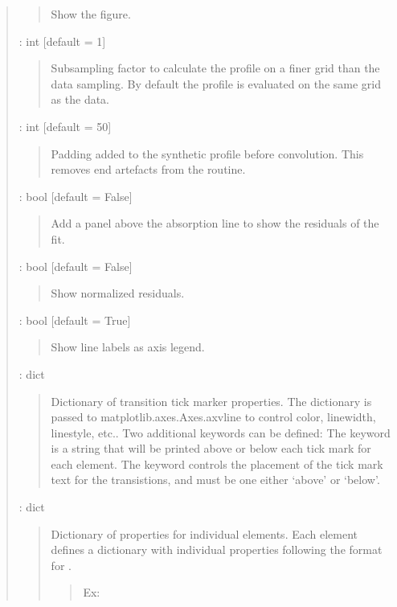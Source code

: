 \documentclass[letterpaper,10pt,english]{sphinxmanual}
\begin{document}
\begin{fulllineitems}
\begin{quote}
\begin{description}
\begin{quote}
Show the figure.
\end{quote}

 : int   {[}default = 1{]}
\begin{quote}

Subsampling factor to calculate the profile on a finer grid than
the data sampling.
By default the profile is evaluated on the same grid as the data.
\end{quote}

 : int   {[}default = 50{]}
\begin{quote}

Padding added to the synthetic profile before convolution.
This removes end artefacts from the  routine.
\end{quote}

 : bool   {[}default = False{]}
\begin{quote}

Add a panel above the absorption line to show the residuals of the fit.
\end{quote}

 : bool   {[}default = False{]}
\begin{quote}

Show normalized residuals.
\end{quote}

 : bool   {[}default = True{]}
\begin{quote}

Show line labels as axis legend.
\end{quote}

 : dict
\begin{quote}

Dictionary of transition tick marker properties. The dictionary is
passed to matplotlib.axes.Axes.axvline to control color, linewidth,
linestyle, etc.. Two additional keywords can be defined:
The keyword  is a string that will be printed above or below
each tick mark for each element.
The keyword  controls the placement of the tick mark text
for the transistions, and must be one either ‘above’ or ‘below’.
\end{quote}

 : dict
\begin{quote}

Dictionary of properties for individual elements.
Each element defines a dictionary with individual properties following
the format for .
\begin{quote}
\begin{description}
\item[{Ex: }] \leavevmode
{}


\end{description}
\end{quote}
\end{quote}
\end{description}
\end{quote}
\end{fulllineitems}
\end{document}
